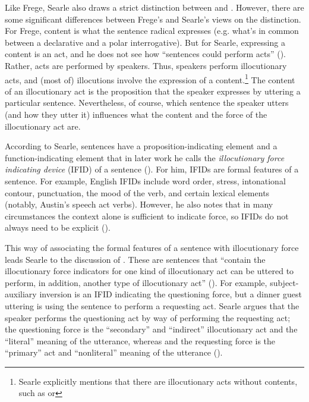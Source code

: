 Like Frege, Searle also draws a strict distinction between  and . However, there are some significant differences between Frege’s and Searle’s views on the distinction. For Frege, content is what the sentence radical expresses (e.g. what’s in common between a declarative and a polar interrogative). But for Searle, expressing a content is an act, and he does not see how ``sentences could perform acts'' (\cite[257]{searle1976class}). Rather, acts are performed by speakers. Thus, speakers perform illocutionary acts, and (most of) illocutions involve the expression of a content.\footnote{Searle explicitly mentions that there are illocutionary acts without contents, such as  or } The content of an illocutionary act is the proposition that the speaker expresses by uttering a particular sentence. Nevertheless, of course, which sentence the speaker utters (and how they utter it) influences what the content and the force of the illocutionary act are. 

According to Searle, sentences have a proposition-indicating element and a function-indicating element that in later work he calls the \emph{illocutionary force indicating device} (IFID) of a sentence (\cite{searle1976class}). For him, IFIDs are formal features of a sentence. For example, English IFIDs include word order, stress, intonational contour, punctuation, the mood of the verb, and certain lexical elements (notably, Austin’s speech act verbs). However, he also notes that in many circumstances the context alone is sufficient to indicate force, so IFIDs do not always need to be explicit (\cite[257]{searle1976class}). 





This way of associating the formal features of a sentence with illocutionary force leads Searle to the discussion of . These are sentences that ``contain the illocutionary force indicators for one kind of illocutionary act can be uttered to perform, in addition, another type of illocutionary act'' (\cite[168]{searle1975indirect}). For example, subject-auxiliary inversion is an IFID indicating the questioning force, but a dinner guest uttering  is using the sentence to perform a requesting act. Searle argues that the speaker performs the questioning act by way of performing the requesting act; the questioning force is the ``secondary'' and ``indirect'' illocutionary act and the ``literal'' meaning of the utterance, whereas and the requesting force is the ``primary'' act and ``nonliteral'' meaning of the utterance (\cite[170]{searle1975indirect}). 

